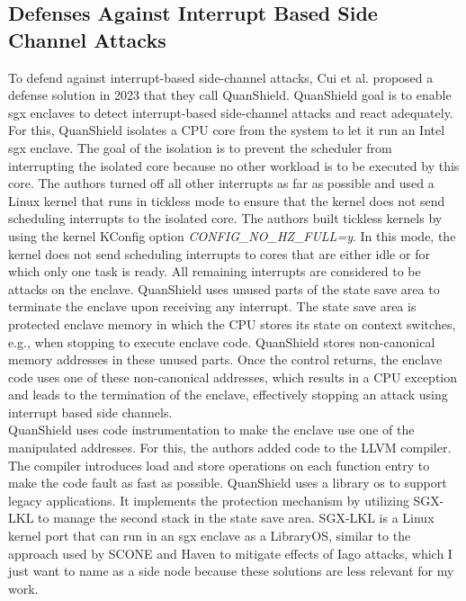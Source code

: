 \subsection{Defenses Against Interrupt Based Side Channel Attacks}
\label{sec:20:interrupt_sca}
To defend against interrupt-based side-channel attacks, Cui et al. proposed a
defense solution in 2023 that they call QuanShield.\cite{cui_quanshield_2023}
QuanShield goal is to enable \gls{sgx} enclaves to detect interrupt-based
side-channel attacks and react adequately. For this, QuanShield isolates a CPU
core from the system to let it run an Intel \gls{sgx} enclave. The goal of the
isolation is to prevent the scheduler from interrupting the isolated core
because no other workload is to be executed by this core. The authors turned off
all other interrupts as far as possible and used a Linux kernel that runs in
tickless mode to ensure that the kernel does not send scheduling interrupts to
the isolated core. The authors built tickless kernels by using the kernel
KConfig option \textit{CONFIG\_NO\_HZ\_FULL=y}. In this mode, the kernel does
not send scheduling interrupts to cores that are either idle or for which only
one task is ready.\cite{linuxtickless} All remaining interrupts are considered
to be attacks on the enclave. QuanShield uses unused parts of the state save
area to terminate the enclave upon receiving any interrupt. The state save area
is protected enclave memory in which the CPU stores its state on context
switches, e.g., when stopping to execute enclave code. QuanShield stores
non-canonical memory addresses in these unused parts. Once the control returns,
the enclave code uses one of these non-canonical addresses, which results in a
CPU exception and leads to the termination of the enclave, effectively stopping
an attack using interrupt based side channels.\\

QuanShield uses code instrumentation to make the enclave use one of the
manipulated addresses. For this, the authors added code to the LLVM compiler.
The compiler introduces load and store operations on each function entry to make
the code fault as fast as possible. QuanShield uses a library \gls{os} to
support legacy applications. It implements the protection mechanism by utilizing
SGX-LKL to manage the second stack in the state save area. SGX-LKL is a Linux
kernel port that can run in an \gls{sgx} enclave as a LibraryOS, similar to the
approach used by SCONE and Haven to mitigate effects of Iago attacks, which I
just want to name as a side node because these solutions are less relevant for
my work.\cite{priebe2019sgx,arnautov_scone_2016,baumann_shielding_2015,
    checkoway2013iago}

